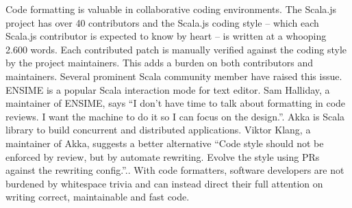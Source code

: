 Code formatting is valuable in collaborative coding environments.
The Scala.js project\autocite{_scala.js_????} has over 40 contributors and the Scala.js coding style\autocite{doeraene_scala.js_2015} -- which each Scala.js contributor is expected to know by heart -- is written at a whooping 2.600 words.
Each contributed patch is manually verified against the coding style by the project maintainers.
This adds a burden on both contributors and maintainers.
Several prominent Scala community member have raised this issue.
ENSIME\autocite{_ensime_????} is a popular Scala interaction mode for text editor.
Sam Halliday, a maintainer of ENSIME, says ``I don't have time to talk about formatting in code reviews. I want the machine to do it so I can focus on the design.''\autocite{halliday_i_2016-1}.
Akka\autocite{_akka_????} is Scala library to build concurrent and distributed applications.
Viktor Klang, a maintainer of Akka, suggests a better alternative ``Code style should not be enforced by review, but by automate rewriting. Evolve the style using PRs against the rewriting config.''.\autocite{klang_code_2016}.
With code formatters, software developers are not burdened by whitespace trivia and can instead direct their full attention on writing correct, maintainable and fast code.

